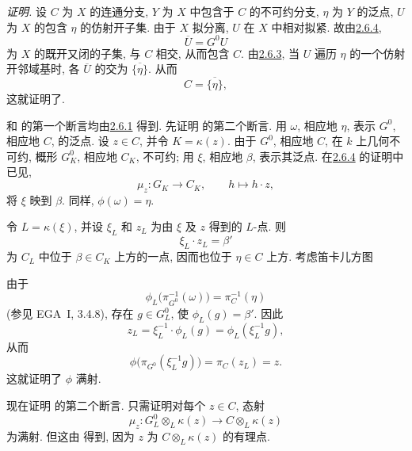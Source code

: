 \noindent\textit{证明.}
 设 \(C\) 为 \(X\) 的连通分支, \(Y\) 为 \(X\) 中包含于 \(C\) 的不可约分支,
\(\eta\) 为 \(Y\) 的泛点, \(U\) 为 \(X\) 的包含 \(\eta\) 的仿射开子集.
由于 \(X\) 拟分离, \(U\) 在 \(X\) 中相对拟紧.
故由\hyperref[prop:sga3-VIA-2.6.4]{2.6.4},
\[
  \overline U=G^0U
\]
为 \(X\) 的既开又闭的子集, 与 \(C\) 相交, 从而包含 \(C\).
由\hyperref[rem:sga3-VIA-2.6.3]{2.6.3}, 当 \(U\) 遍历 \(\eta\)
的一个仿射开邻域基时, 各 \(\overline U\) 的交为 \(\overline{\{\eta\}}\).
从而
\[
  C=\overline{\{\eta\}},
\]
这就证明了.

 和
的第一个断言均由\hyperref[prop:sga3-VIA-2.6.1]{2.6.1} 得到.
先证明 的第二个断言.
用 \(\omega\), 相应地 \(\eta\), 表示 \(G^0\), 相应地 \(C\), 的泛点.
设 \(z\in C\), 并令 \(K=\kappa(z)\).
由于 \(G^0\), 相应地 \(C\), 在 \(k\) 上几何不可约,
概形 \(G^0_K\), 相应地 \(C_K\), 不可约;
用 \(\xi\), 相应地 \(\beta\), 表示其泛点.
在\hyperref[prop:sga3-VIA-2.6.4]{2.6.4} 的证明中已见,
\[
  \mu_z:G_K\longrightarrow C_K,\qquad h\longmapsto h\cdot z,
\]
将 \(\xi\) 映到 \(\beta\). 同样, \(\phi(\omega)=\eta\).

令 \(L=\kappa(\xi)\), 并设 \(\xi_L\) 和 \(z_L\)
为由 \(\xi\) 及 \(z\) 得到的 \(L\)-点. 则
\[
  \xi_L\cdot z_L=\beta'
\]
为 \(C_L\) 中位于 \(\beta\in C_K\) 上方的一点,
因而也位于 \(\eta\in C\) 上方. 考虑笛卡儿方图
\begin{center}
  \label{diag:sga3-VIA-2.6.6-cartesian-square}%
\end{center}
由于
\[
  \phi_L\bigl(\pi_{G^0}^{-1}(\omega)\bigr)
  =
  \pi_C^{-1}(\eta)
\]
(参见 EGA~I, 3.4.8), 存在 \(g\in G^0_L\),
使 \(\phi_L(g)=\beta'\). 因此
\[
  z_L
  =
  \xi_L^{-1}\cdot\phi_L(g)
  =
  \phi_L(\xi_L^{-1}g),
\]
从而
\[
  \phi\bigl(\pi_{G^0}(\xi_L^{-1}g)\bigr)
  =
  \pi_C(z_L)
  =
  z.
\]
这就证明了 \(\phi\) 满射.

现在证明 的第二个断言.
只需证明对每个 \(z\in C\), 态射
\[
  \mu_z:
  G^0_L\otimes_L\kappa(z)
  \longrightarrow
  C\otimes_L\kappa(z)
\]
为满射. 但这由 得到,
因为 \(z\) 为 \(C\otimes_L\kappa(z)\) 的有理点.

